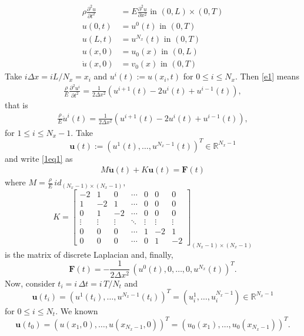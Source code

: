 \documentclass{ws-m3as}
\begin{document}
\begin{align}
\rho \frac{\partial^2 u}{\partial t^2} & = E  \frac{\partial^2 u}{\partial x^2} \text{ in } (0,L) \times (0,T) \label{e1}\\
u(0,t) & = u^0(t) \text{ in } (0,T) \label{e2}\\
u(L,t) & = u^{N_x}(t)  \text{ in } (0,T) \label{e3} \\
u(x,0) & = u_0(x)  \text{ in } (0,L) \label{e4}\\
\dot{u}(x,0) &  = v_0(x)  \text{ in } (0,T) \label{e5}
\end{align}
Take $i\Delta x = i L/N_x = x_i$ and $u^{i}(t):=u(x_i,t)$  for $0 \le i \le N_x.$ Then \eqref{e1} means
\begin{align}
\frac{\rho}{E} \frac{\partial^2 u^i}{\partial t^2}  = \frac{1}{2\Delta x^2} \left(u^{i+1}(t) -2u^i(t)+u^{i-1}(t)\right),
\end{align}
that is
\begin{align}
\frac{\rho}{E} \ddot{u}^i(t)  = \frac{1}{2\Delta x^2} \left(u^{i+1}(t) -2u^i(t)+u^{i-1}(t)\right), \label{1eq1}
\end{align}
for $1 \le i \le N_x-1.$ Take
$$
\mathbf{u}(t):=(u^1(t),\ldots,u^{N_x-1}(t))^T \in \mathbb{R}^{N_x-1}
$$
and write \eqref{1eq1} as
\begin{align}
M \ddot{\mathbf{u}}(t)  + K \mathbf{u}(t) = \mathbf{F}(t) \label{Peq}
\end{align}
where $M = \frac{\rho}{E} \, id_{(N_x-1) \times (N_x-1)},$ 
$$
K = \left[
\begin{array}{ccccccc}
-2 & 1 & 0 & \cdots & 0 & 0 & 0 \\
1 & -2 & 1 & \cdots & 0 & 0 & 0 \\
0 & 1 & -2 & \cdots & 0 & 0 & 0 \\
\vdots & \vdots & \vdots & \ddots & \vdots & \vdots & \vdots \\
0 & 0 & 0 & \cdots & 1 & -2 & 1 \\
0 & 0 & 0 & \cdots & 0 & 1 & -2
\end{array}
\right]_{(N_x-1) \times (N_x-1)}
$$
is the matrix of discrete Laplacian and, finally,
$$
\mathbf{F}(t) = -\frac{1}{2\Delta x^2}\,(u^0(t),0,\ldots,0,u^{N_x}(t))^T.
$$
Now, consider $t_i = i \,\Delta t = i \, T/N_t$ and 
$$
\mathbf{u}(t_i) = (u^1(t_i),\ldots,u^{N_x-1}(t_i))^T = (u^1_i,\ldots,u^{N_x-1}_i) \in \mathbb{R}^{N_x-1}
$$
for $0 \le i \le N_t.$ We known
$$
\mathbf{u}(t_0) = (u(x_1,0),\ldots,u(x_{N_x-1},0))^T = (u_0(x_1),\ldots,u_0(x_{N_x-1}))^T.
$$
\end{document}
